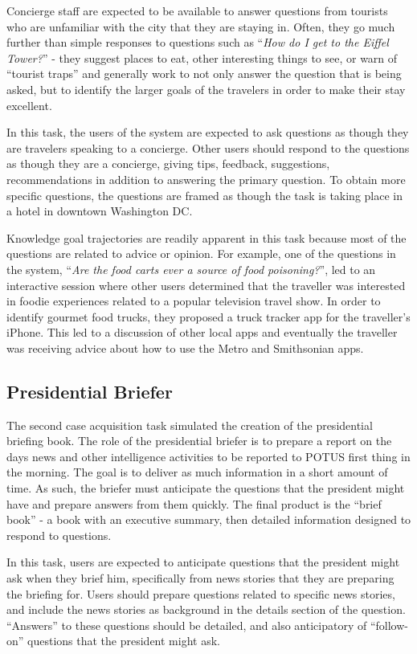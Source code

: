 \documentclass{llncs}
\begin{document}
Concierge staff are expected to be available to answer questions from tourists who are unfamiliar with the city that they are staying in. Often, they go much further than simple responses to questions such as ``\textit{How do I get to the Eiffel Tower?}'' - they suggest places to eat, other interesting things to see, or warn of ``tourist traps'' and generally work to not only answer the question that is being asked, but to identify the larger goals of the travelers in order to make their stay excellent.

In this task, the users of the system are expected to ask questions as though they are travelers speaking to a concierge. Other users should respond to the questions as though they are a concierge, giving tips, feedback, suggestions, recommendations in addition to answering the primary question. To obtain more specific questions, the questions are framed as though the task is taking place in a hotel in downtown Washington DC.

Knowledge goal trajectories are readily apparent in this task because most of the questions are related to advice or opinion. For example, one of the questions in the system, ``\textit{Are the food carts ever a source of food poisoning?}'', led to an interactive session where other users determined that the traveller was interested in foodie experiences related to a popular television travel show. In order to identify gourmet food trucks, they proposed a truck tracker app for the traveller's iPhone. This led to a discussion of other local apps and eventually the traveller was receiving advice about how to use the Metro and Smithsonian apps.

\subsection{Presidential Briefer}

The second case acquisition task simulated the creation of the presidential briefing book. The role of the presidential briefer is to prepare a report on the days news and other intelligence activities to be reported to POTUS first thing in the morning. The goal is to deliver as much information in a short amount of time. As such, the briefer must anticipate the questions that the president might have and prepare answers from them quickly. The final product is the ``brief book'' - a book with an executive summary, then detailed information designed to respond to questions.

In this task, users are expected to anticipate questions that the president might ask when they brief him, specifically from news stories that they are preparing the briefing for. Users should prepare questions related to specific news stories, and include the news stories as background in the details section of the question. ``Answers'' to these questions should be detailed, and also anticipatory of ``follow-on'' questions that the president might ask.
\end{document}
